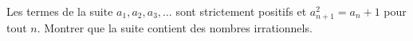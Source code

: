 Les termes de la suite $a_1, a_2, a_3, \ldots$ sont strictement positifs et $a_{n+1}^2 = a_n + 1$ pour tout $n$. Montrer que la suite contient des nombres irrationnels.
